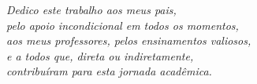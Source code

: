 \thispagestyle{empty}

\vspace*{\fill}

\begin{flushright}
    \textit{Dedico este trabalho aos meus pais,\\
    pelo apoio incondicional em todos os momentos,\\
    aos meus professores, pelos ensinamentos valiosos,\\
    e a todos que, direta ou indiretamente,\\
    contribuíram para esta jornada acadêmica.}
\end{flushright}

\vspace*{\fill}
\clearpage